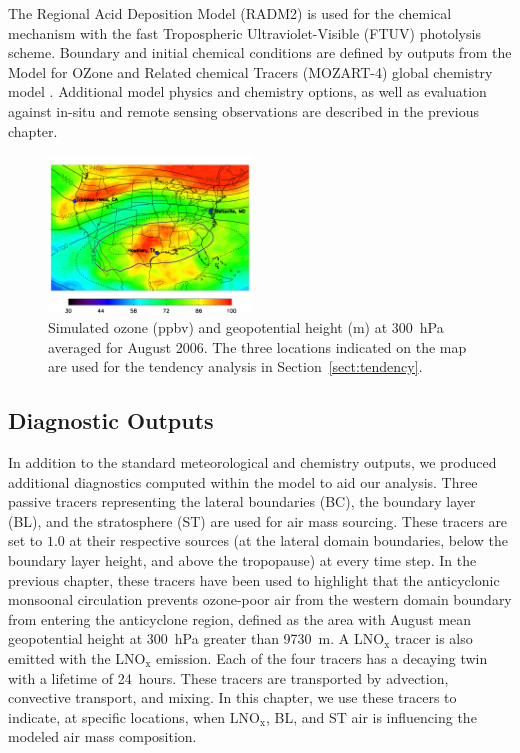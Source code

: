 The Regional Acid Deposition Model (RADM2) \citep{Stockwell:1990ez} is used for
the chemical mechanism with the fast Tropospheric Ultraviolet-Visible (FTUV)
\citep{Tie:2003ve} photolysis scheme. Boundary and initial chemical conditions are defined
by outputs from the Model for OZone and Related chemical Tracers (MOZART-4)
global chemistry model \citep{Emmons:2010fk}.
Additional model physics and chemistry options, as well as evaluation against
in-situ and remote sensing observations are described in the previous chapter.

\begin{figure}
	\centering
	\begin{singlespacing}
	\includegraphics[width=0.48\textwidth]{Figures/o3_map.png}
	\caption[Simulated August mean ozone and geopotential heights at 300~hPa]{{\small
	Simulated ozone (ppbv) and geopotential height (m) at 300~hPa averaged for August 2006. The three locations indicated on the map
	are used for the tendency analysis in Section~\ref{sect:tendency}.}}
	\label{fig:o3_map2}
	\end{singlespacing}
\end{figure}

\subsection{Diagnostic Outputs}

In addition to the standard meteorological and chemistry outputs, we produced additional
diagnostics computed within the model to aid our analysis.
Three passive tracers representing the lateral boundaries (BC), the boundary layer (BL), and the
stratosphere (ST) are used for air mass sourcing. These tracers are set to $1.0$ at their respective
sources (at the lateral domain boundaries, below the boundary layer height, and above
the tropopause) at every time step. In the previous chapter, these
tracers have been used to highlight that the anticyclonic monsoonal circulation prevents
ozone-poor air from the western domain boundary from entering the anticyclone region,
defined as the area with August mean geopotential height at 300~hPa greater than  9730~m.
A LNO$_\mathrm{x}$ tracer is also emitted with the LNO$_\mathrm{x}$ emission. Each of the four tracers has a
decaying twin with a lifetime of 24~hours. These tracers are
transported by advection, convective transport, and mixing. In this chapter, we use these
tracers to indicate, at specific locations, when $\mathrm{LNO_x}$, BL, and ST air
is influencing the modeled air mass composition.

